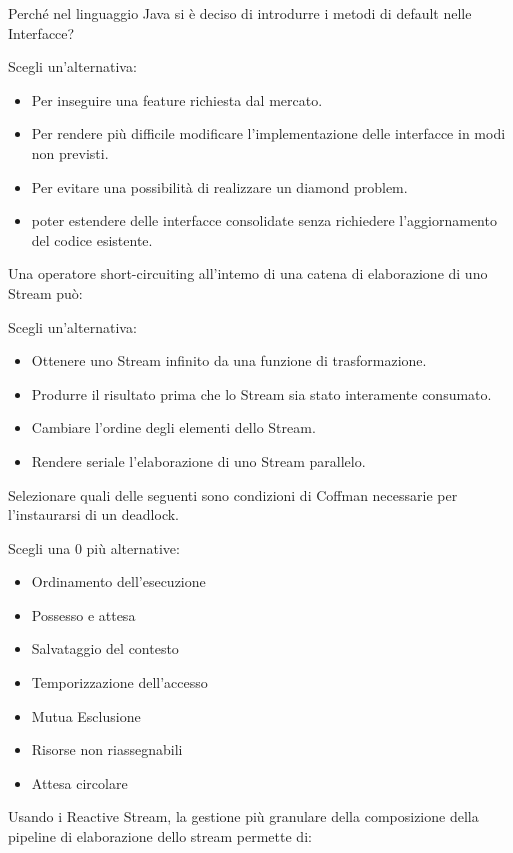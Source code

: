 \documentclass{article}
\begin{document}
Perché nel linguaggio Java si è deciso di introdurre i metodi di default nelle Interfacce?

Scegli un'alternativa: \begin{itemize}

	\item Per inseguire una feature richiesta dal mercato.
	\item Per rendere più difficile modificare l'implementazione delle
		interfacce in modi non previsti. 
	\item Per evitare una possibilità di realizzare un diamond problem.
	\item poter estendere delle interfacce consolidate senza richiedere
		l'aggiornamento del codice esistente. \checkmark
\end{itemize}

Una operatore short-circuiting all'intemo di una catena di elaborazione di uno Stream può:

Scegli un'alternativa: \begin{itemize}

	\item Ottenere uno Stream infinito da una funzione di trasformazione.
	\item Produrre il risultato prima che lo Stream sia stato interamente
		consumato. \checkmark
	\item Cambiare l'ordine degli elementi dello Stream.
	\item Rendere seriale l'elaborazione di uno Stream parallelo.
\end{itemize}


Selezionare quali delle seguenti sono condizioni di Coffman necessarie per l'instaurarsi di un deadlock.

Scegli una 0 più alternative:
\begin{itemize}

	\item Ordinamento dell'esecuzione
	\item Possesso e attesa \checkmark
	\item Salvataggio del contesto
	\item Temporizzazione dell'accesso
	\item Mutua Esclusione \checkmark 
	\item Risorse non riassegnabili \checkmark
	\item Attesa circolare \checkmark
\end{itemize}

Usando i Reactive Stream, la gestione più granulare della composizione della pipeline di elaborazione dello stream permette di:
\end{document}
